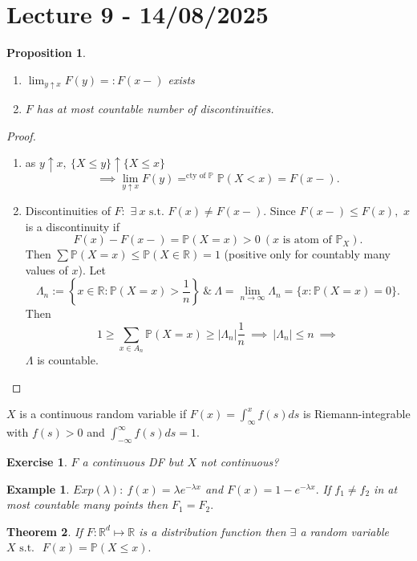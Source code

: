 \documentclass{article}
\newcommand{\1}{\mathds{1}}
\newcommand{\R}{\mathbb{R}}
\newcommand{\PB}{\mathbb{P}}
\newcommand{\lf}{\left}
\newcommand{\rg}{\right}
\newcommand{\f}[2]{\frac{#1}{#2}}
\newcommand{\st}{\text{ s.t. }}
\newcommand{\card}[1]{\lf\vert #1\rg\vert}
\newtheorem{theorem}{Theorem}[section]
\newtheorem{proposition}[theorem]{Proposition}
\newtheorem{example}{Example}
\newtheorem{exercise}{Exercise}
\begin{document}
\section{Lecture 9 - 14/08/2025}
\begin{proposition}
    \begin{enumerate}
        \item $\lim_{y\uparrow x}F(y)=:F(x-)$ exists
        \item $F$ has at most countable number of discontinuities.
    \end{enumerate}
\end{proposition}
\begin{proof}
    \begin{enumerate}
        \item as $y\uparrow x,\ \{X\leq y\}\uparrow\{X\leq x\}$ $$\implies \lim_{y\uparrow x}F(y)=^{\text{cty of }\PB}\PB(X<x)=F(x-).$$
        \item Discontinuities of $F:$ $\exists\ x\st F(x)\neq F(x-).$ Since $F(x-)\leq F(x),$ $x$ is a discontinuity if $$F(x)-F(x-)=\PB(X=x)>0\ (x\text{ is atom of }\PB_X).$$ Then $\sum\PB(X=x)\leq \PB(X\in\R)=1$ (positive only for countably many values of $x$). Let $$\Lambda_n:=\lf\{x\in\R:\PB(X=x)>\f1n\rg\}\ \&\ \Lambda=\lim_{n\to\infty}\Lambda_n=\{x:\PB(X=x)=0\}.$$ Then $$1\geq \sum_{x\in A_n}\PB(X=x)\geq \card{\Lambda_n}\f1n\ \implies\ \card{\Lambda_n}\leq n\ \implies$$ $\Lambda$ is countable.
    \end{enumerate}
\end{proof}
$X$ is a continuous random variable if $F(x)=\int_{\infty}^xf(s)ds$ is Riemann-integrable with $f(s)>0$ and $\int_{-\infty}^\infty f(s)ds=1.$
\begin{exercise}
    $F$ a continuous DF but $X$ not continuous?
\end{exercise}
\begin{example}
    $Exp(\lambda):\ f(x)=\lambda e^{-\lambda x}$ and $F(x)=1-e^{-\lambda x}.$ If $f_1\neq f_2$ in at most countable many points then $F_1=F_2.$
\end{example}
\begin{theorem}
    If $F:\R^d\mapsto\R$ is a distribution function then $\exists$ a random variable $X\st$ $F(x)=\PB(X\leq x).$
\end{theorem}
\end{document}
